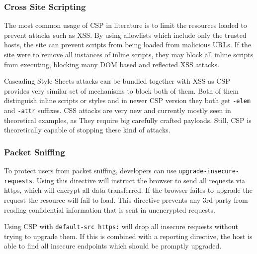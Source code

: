 \subsubsection{Cross Site Scripting}
The most common usage of CSP in literature is to limit the resources loaded to prevent attacks such as XSS.
By using allowlists which include only the trusted hosts, the site can prevent scripts from being loaded from malicious URLs.
If the site were to remove all instances of inline scripts, they may block all inline scripts from executing, blocking many DOM based and reflected XSS attacks.

Cascading Style Sheets attacks can be bundled together with XSS as CSP provides very similar set of mechanisms to block both of them.
Both of them distinguish inline scripts or styles and in newer CSP version they both get \texttt{-elem} and \texttt{-attr} suffixes.
CSS attacks are very new and currently mostly seen in theoretical examples, as They require big carefully crafted payloads.
Still, CSP is theoretically capable of stopping these kind of attacks.

\subsubsection{Packet Sniffing}
To protect users from packet sniffing, developers can use \texttt{upgrade-insecure-requests}.
Using this directive will instruct the browser to send all requests via https, which will encrypt all data transferred.
If the browser failes to upgrade the request the resource will fail to load.
This directive prevents any 3rd party from reading confidential information that is sent in unencrypted requests.

Using CSP with \texttt{default-src https:} will drop all insecure requests without trying to upgrade them.
If this is combined with a reporting directive, the host is able to find all insecure endpoints which should be promptly upgraded.


